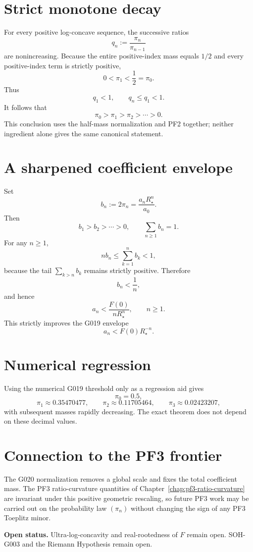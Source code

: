 \section{Strict monotone decay}

For every positive log-concave sequence, the successive ratios
\[
 q_n:=\frac{\pi_n}{\pi_{n-1}}
\]
are nonincreasing.  Because the entire positive-index mass equals \(1/2\) and every positive-index term is strictly positive,
\[
 0<\pi_1<\frac12=\pi_0.
\]
Thus
\[
 q_1<1,
 \qquad
 q_n\le q_1<1.
\]
It follows that
\[
 \boxed{
 \pi_0>\pi_1>\pi_2>\cdots>0.
 }
\]
This conclusion uses the half-mass normalization and PF2 together; neither ingredient alone gives the same canonical statement.

\section{A sharpened coefficient envelope}

Set
\[
 b_n:=2\pi_n=\frac{a_nR_\star^n}{a_0}.
\]
Then
\[
 b_1>b_2>\cdots>0,
 \qquad
 \sum_{n\ge1}b_n=1.
\]
For any \(n\ge1\),
\[
 nb_n\le\sum_{k=1}^{n}b_k<1,
\]
because the tail \(\sum_{k>n}b_k\) remains strictly positive.  Therefore
\[
 b_n<\frac1n,
\]
and hence
\[
 \boxed{
 a_n<\frac{F(0)}{nR_\star^n},
 \qquad n\ge1.
 }
\]
This strictly improves the G019 envelope
\[
 a_n<F(0)R_\star^{-n}.
\]

\section{Numerical regression}

Using the numerical G019 threshold only as a regression aid gives
\[
 \pi_0=0.5,
\]
\[
 \pi_1\approx0.35470477,
 \qquad
 \pi_2\approx0.11705464,
 \qquad
 \pi_3\approx0.02423207,
\]
with subsequent masses rapidly decreasing.  The exact theorem does not depend on these decimal values.

\section{Connection to the PF3 frontier}

The G020 normalization removes a global scale and fixes the total coefficient mass.  The PF3 ratio-curvature quantities of Chapter~\ref{chap:pf3-ratio-curvature} are invariant under this positive geometric rescaling, so future PF3 work may be carried out on the probability law \((\pi_n)\) without changing the sign of any PF3 Toeplitz minor.


\noindent\textbf{Open status.} Ultra-log-concavity and real-rootedness of \(F\) remain open.  SOH-G003 and the Riemann Hypothesis remain open.
